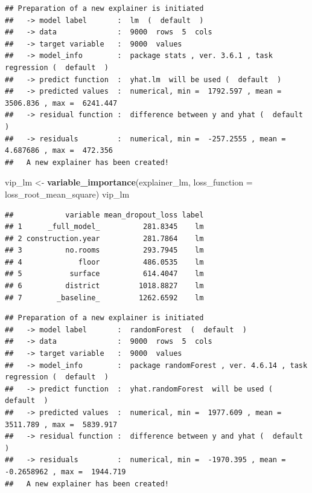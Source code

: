 \documentclass[12pt,]{krantz}
\newenvironment{Shaded}{\begin{snugshade}}{\end{snugshade}}
\newcommand{\DataTypeTok}[1]{\textcolor[rgb]{0.13,0.29,0.53}{#1}}
\newcommand{\DecValTok}[1]{\textcolor[rgb]{0.00,0.00,0.81}{#1}}
\newcommand{\KeywordTok}[1]{\textcolor[rgb]{0.13,0.29,0.53}{\textbf{#1}}}
\newcommand{\NormalTok}[1]{#1}
\newcommand{\OperatorTok}[1]{\textcolor[rgb]{0.81,0.36,0.00}{\textbf{#1}}}
\newcommand{\OtherTok}[1]{\textcolor[rgb]{0.56,0.35,0.01}{#1}}
\newcommand{\StringTok}[1]{\textcolor[rgb]{0.31,0.60,0.02}{#1}}
\begin{document}
\begin{verbatim}
## Preparation of a new explainer is initiated
##   -> model label       :  lm  (  default  )
##   -> data              :  9000  rows  5  cols 
##   -> target variable   :  9000  values 
##   -> model_info        :  package stats , ver. 3.6.1 , task regression (  default  ) 
##   -> predict function  :  yhat.lm  will be used (  default  )
##   -> predicted values  :  numerical, min =  1792.597 , mean =  3506.836 , max =  6241.447  
##   -> residual function :  difference between y and yhat (  default  )
##   -> residuals         :  numerical, min =  -257.2555 , mean =  4.687686 , max =  472.356  
##   A new explainer has been created!
\end{verbatim}

\begin{Shaded}
\begin{Highlighting}[]
\NormalTok{vip_lm <-}\StringTok{ }\KeywordTok{variable_importance}\NormalTok{(explainer_lm, }
            \DataTypeTok{loss_function =}\NormalTok{ loss_root_mean_square)}
\NormalTok{vip_lm}
\end{Highlighting}
\end{Shaded}

\begin{verbatim}
##            variable mean_dropout_loss label
## 1      _full_model_          281.8345    lm
## 2 construction.year          281.7864    lm
## 3          no.rooms          293.7945    lm
## 4             floor          486.0535    lm
## 5           surface          614.4047    lm
## 6          district         1018.8827    lm
## 7        _baseline_         1262.6592    lm
\end{verbatim}

\begin{Shaded}
\end{Shaded}

\begin{verbatim}
## Preparation of a new explainer is initiated
##   -> model label       :  randomForest  (  default  )
##   -> data              :  9000  rows  5  cols 
##   -> target variable   :  9000  values 
##   -> model_info        :  package randomForest , ver. 4.6.14 , task regression (  default  ) 
##   -> predict function  :  yhat.randomForest  will be used (  default  )
##   -> predicted values  :  numerical, min =  1977.609 , mean =  3511.789 , max =  5839.917  
##   -> residual function :  difference between y and yhat (  default  )
##   -> residuals         :  numerical, min =  -1970.395 , mean =  -0.2658962 , max =  1944.719  
##   A new explainer has been created!
\end{verbatim}
\end{document}
